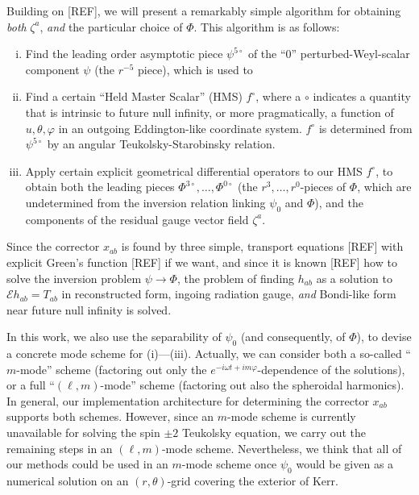 \documentclass[%
reprint,
 prd,
superscriptaddress,
nofootinbib,
aps,
dvipsnames
]{revtex4-2}
\newcommand{\E}{{\mathcal E}}
\begin{document}
Building on [REF], we will present a remarkably simple algorithm for obtaining {\it both} $\zeta^a$, {\it and} the particular choice of $\Phi$. 
This algorithm is as follows:
\begin{enumerate}[(i)]
\item 
Find the leading order 
asymptotic piece $\psi^{5\circ}$ of the ``0'' perturbed-Weyl-scalar component $\psi$ (the $r^{-5}$ piece), which is used to 
\item 
Find a certain ``Held Master Scalar'' (HMS) $f^\circ$, where a $\circ$ indicates a quantity that is intrinsic to future null infinity, or more pragmatically, a function of $u,\theta,\varphi$ in an outgoing Eddington-like coordinate system. $f^\circ$ is determined from $\psi^{5\circ}$ by an angular Teukolsky-Starobinsky relation. 
\item 
Apply certain explicit geometrical differential operators to our HMS $f^\circ$, to obtain both the leading pieces $\Phi^{3\circ}, \dots, \Phi^{0\circ}$ (the $r^3, \dots, r^0$-pieces of $\Phi$, which are undetermined from the inversion relation linking $\psi_0$
and $\Phi$), and the components of the residual gauge vector field $\zeta^a$.
\end{enumerate}
Since the corrector $x_{ab}$ is found by three simple, transport equations [REF] with explicit Green's function [REF] if we want, and since it is known [REF] how to solve the inversion problem $\psi \to \Phi$, the problem of finding $h_{ab}$ as a solution to $\E h_{ab} = T_{ab}$ in reconstructed form, ingoing radiation gauge, {\it and} Bondi-like form near future null infinity is solved. 

In this work, we also use the separability of $\psi_0$
(and consequently, of $\Phi$), to devise a concrete mode scheme for (i)---(iii). Actually, we can consider both a so-called ``$m$-mode'' scheme (factoring out only the 
$e^{-i\omega t+im\varphi}$-dependence of the solutions), or a full ``$(\ell,m)$-mode'' scheme (factoring out also the spheroidal harmonics). 
In general, our implementation architecture for determining the corrector $x_{ab}$ supports both schemes. However, since an $m$-mode scheme is currently unavailable for solving the spin $\pm 2$ Teukolsky equation, we carry out the remaining steps in an $(\ell,m)$-mode scheme. Nevertheless, we think that all of our methods could be used in an $m$-mode scheme once $\psi_0$ would be given as a numerical solution on an $(r,\theta)$-grid covering the exterior of Kerr. 
\end{document}
